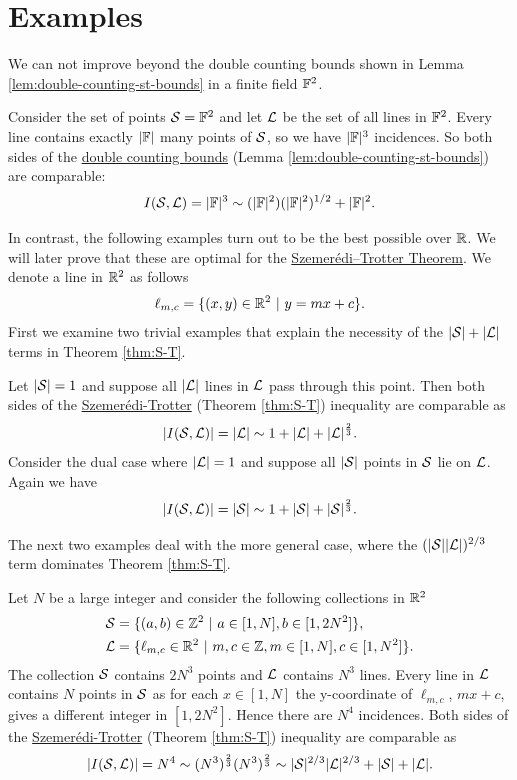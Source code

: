 \section{Examples}
We can not improve beyond the double counting bounds shown in Lemma \ref{lem:double-counting-st-bounds} in a finite field $\mathbb F^2$. 
\begin{example}
Consider the set of points $\mathcal S=\mathbb F^2$ and let $\mathcal L$ be the set of all lines 
in $\mathbb F^2$. Every line contains exactly $|\mathbb F|$ many points of $\mathcal S$, so we have $|\mathbb F|^3$ incidences. 
So both sides of the \hyperref[lem:double-counting-st-bounds]{double counting bounds} (Lemma \ref{lem:double-counting-st-bounds}) are comparable:
\[
I(\mathcal S,\mathcal L) = |\mathbb F|^3 \sim (|\mathbb F|^2)(|\mathbb F|^2)^{1/2} + |\mathbb F|^2.
\]
\end{example}
In contrast, the following examples turn out to be the best possible over $\mathbb R$. We will later prove that these are optimal for the \hyperref[thm:S-T]{Szemerédi–Trotter Theorem}.
We denote a line in $\mathbb R^2$ as follows
\[
    \ell_{m,c} = \{(x,y) \in \mathbb R^2 \ | \ y = mx+c\}.     
\]
First we examine two trivial examples that explain the necessity of the $|\mathcal S| + |\mathcal L|$ terms in Theorem \ref{thm:S-T}.
\begin{example}
    Let $|\mathcal S| = 1$ and suppose all $|\mathcal L|$ lines in $\mathcal L$ pass through this point. Then both sides of the \hyperref[thm:S-T]{Szemerédi-Trotter} (Theorem \ref{thm:S-T}) inequality are comparable as
    \[  
        |I(\mathcal S,\mathcal L)| = |\mathcal L| \sim 1 + |\mathcal L| + |\mathcal L|^{\frac23}.   
    \]
    Consider the dual case where $|\mathcal L| = 1$ and suppose all $|\mathcal S|$ points in $\mathcal S$ lie on $\mathcal L$. Again we have
    \[
        |I(\mathcal S,\mathcal L)| = |\mathcal S| \sim 1 + |\mathcal S| + |\mathcal S|^{\frac23}. 
    \]
\end{example}
The next two examples deal with the more general case, where the $(|\mathcal S||\mathcal L|)^{2/3}$ term dominates Theorem \ref{thm:S-T}. 
\begin{example} \label{ex:ST-1}
    Let $N$ be a large integer and consider the following collections in $\mathbb R^2$
    \begin{align*}
    \mathcal S &= \{ (a,b) \in \mathbb Z^2 \ | \ a\in [1,N], b \in [1,2N^2] \}, \\
    \mathcal L &= \{ \ell_{m,c} \in \mathbb R^2 \ | \ m,c\in \mathbb Z, m\in [1,N], c \in [1,N^2] \}. \end{align*}
    The collection $\mathcal S$ contains $2N^3$ points and $\mathcal L$ contains $N^3$ lines. Every line in $\mathcal L$ contains $N$ points in $\mathcal S$ as for each $x \in [1,N]$  the y-coordinate of $\ell_{m,c}$, $ mx+c$, gives a different integer in $[1,2N^2]$.
    Hence there are $N^4$ incidences. Both sides of the \hyperref[thm:S-T]{Szemerédi-Trotter} (Theorem \ref{thm:S-T}) inequality are comparable as 
    $$ |I(\mathcal S,\mathcal L)| = N^4 \sim (N^3)^{\frac{2}{3}} (N^3)^{\frac{2}{3}} \sim |\mathcal S|^{2/3} |\mathcal L|^{2/3} + |\mathcal S| + |\mathcal L|.$$
\end{example}
